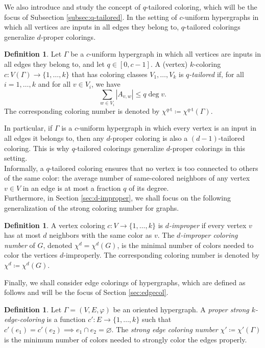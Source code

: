 \documentclass{article}
\theoremstyle{plain}
\theoremstyle{definition}
\newtheorem{definition}[theorem]{Definition}
\theoremstyle{remark}
\begin{document}
We also introduce and study the concept of $q$-tailored coloring, which will be the focus of Subsection \ref{subsec:q-tailored}. In the setting of $c$-uniform hypergraphs in which all vertices are inputs in all edges they belong to, $q$-tailored colorings generalize $d$-proper colorings. 
\begin{definition}\label{def:q-tailored1}
    Let $\Gamma$ be a $c$-uniform hypergraph in which all vertices are inputs in all edges they belong to, and let $q\in [0,c-1]$. A (vertex) $k$-coloring $c\colon V(\Gamma)\to \{1,\ldots,k\}$ that has coloring classes $V_1,\ldots,V_k$ is \emph{$q$-tailored} if, for all $i=1,\ldots,k$ and for all $v\in V_i$, we have
    \begin{equation}
        \sum_{w\in V_i}|A_{v,w}|\leq q \deg v.
    \end{equation}
    The corresponding coloring number is denoted by $\chi^{q\text{-t}}\coloneqq \chi^{q\text{-t}}(\Gamma)$.
\end{definition}

In particular, if $\Gamma$ is a $c$-uniform hypergraph in which every vertex is an input in all edges it belongs to, then any $d$-proper coloring is also a $(d-1)$-tailored coloring. This is why $q$-tailored colorings generalize $d$-proper colorings in this setting.\\

Informally, a $q$-tailored coloring ensures that no vertex is too connected to others of the same color: the average number of same-colored neighbors of any vertex $v\in V$ in an edge is at most a fraction $q$ of its degree.\\


Furthermore, in Section \ref{sec:d-improper}, we shall focus on the following generalization of the strong coloring number for graphs.
\begin{definition}\label{def:d-improper1}
    A vertex coloring $c\colon V\to \{1,\ldots,k\}$ is \emph{$d$-improper} if every vertex $v$ has at most $d$ neighbors with the same color as $v$. The \emph{$d$-improper coloring number} of $G$, denoted $\chi^d=\chi^d(G)$, is the minimal number of colors needed to color the vertices $d$-improperly. The corresponding coloring number is denoted by $\chi^d\coloneqq \chi^d(G)$.
\end{definition}
Finally, we shall consider edge colorings of hypergraphs, which are defined as follows and will be the focus of Section \ref{sec:edgecol}.
\begin{definition}\label{def:edge-coloring}
    Let $\Gamma=(V,E,\varphi)$ be an oriented hypergraph. A \emph{proper strong $k$-edge-coloring} is a function $c'\colon E\to \{1,\ldots,k\}$ such that $c'(e_1) = c'(e_2)\implies e_1\cap e_2=\varnothing$. The \emph{strong edge coloring number} $\chi'\coloneqq \chi'(\Gamma)$ is the minimum number of colors needed to strongly color the edges properly.
\end{definition}
\end{document}
